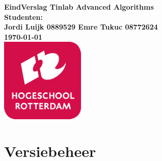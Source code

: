 \documentclass{article}
\begin{document}
\sffamily



\begin{titlepage}
  \centering
    \vfill
    {\bfseries\Huge
      EindVerslag Tinlab Advanced Algorithms \\
        \vskip2cm
      }
      {\bfseries\Large
        Studenten:\\
      }
      {
        \bfseries\normalsize
        Jordi Luijk 0889529 \newline
        Emre Tukuc 08772624 \newline\\
        \vskip1cm
        \today\\
    }    
    \vfill
    \includegraphics[width=4cm]{logohr.png} %
    \vfill
    \vfill
\end{titlepage}
\newpage
\tableofcontents

\newpage
\section{Versiebeheer}
\end{document}
